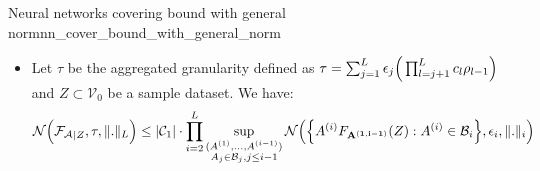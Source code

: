 \begin{theorem}{Neural networks covering bound with general norm}{nn_cover_bound_with_general_norm}
\begin{itemize}
        \item Let $\tau$ be the aggregated granularity defined as $\tau = \sum_{j=1}^L \epsilon_j \Big( \prod_{l=j+1}^L c_l\rho_{l-1} \Big)$ and $Z\subset\mathcal{V}_0$ be a sample dataset. We have:
        \begin{align*}
            \mathcal{N}\Big( 
                {\mathcal{F}_\mathcal{A}}_{|Z}, \tau, \|.\|_L
             \Big) \le |\mathcal{C}_1|\cdot\prod_{i=2}^L \sup_{\substack{
                (A^{(1)}, \dots, A^{(i-1)}) \\
                A_j \in \mathcal{B}_j, j \le i-1
            }}\mathcal{N}\Big( 
                \Big\{ A^{(i)}F_{\bf A^{(1, i-1)}}(Z) : A^{(i)} \in \mathcal{B}_i \Big\}, \epsilon_i, \|.\|_i
             \Big)
        \end{align*}
    \end{itemize}
\end{theorem}

